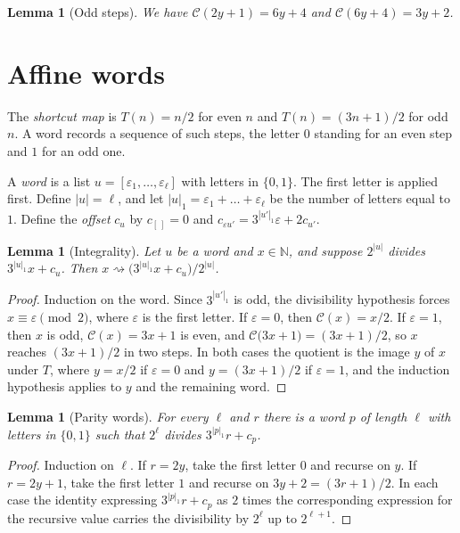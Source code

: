 \documentclass[11pt,reqno,oneside]{amsart}
\theoremstyle{plain}
\newtheorem{lemma}[theorem]{Lemma}
\theoremstyle{definition}
\numberwithin{equation}{section}
\begin{document}
\begin{lemma}[Odd steps]\label{lem:oddsteps}
We have $\mathcal C(2y+1)=6y+4$ and $\mathcal C(6y+4)=3y+2$.
\end{lemma}

\section{Affine words}\label{sec:words}

The \emph{shortcut map} is $T(n)=n/2$ for even $n$ and $T(n)=(3n+1)/2$ for odd $n$. A word records a sequence of such steps, the letter $0$ standing for an even step and $1$ for an odd one.

A \emph{word} is a list $u=[\varepsilon_1,\dots,\varepsilon_\ell]$ with letters in $\{0,1\}$. The first letter is applied first. Define $|u|=\ell$, and let $|u|_1=\varepsilon_1+\dots+\varepsilon_\ell$ be the number of letters equal to $1$. Define the \emph{offset} $c_u$ by $c_{[\,]}=0$ and $c_{\varepsilon u'}=3^{|u'|_1}\varepsilon+2c_{u'}$.

\begin{lemma}[Integrality]\label{lem:integrality}
Let $u$ be a word and $x\in\mathbb N$, and suppose $2^{|u|}$ divides $3^{|u|_1}x+c_u$. Then $x\rightsquigarrow\bigl(3^{|u|_1}x+c_u\bigr)/2^{|u|}$.
\end{lemma}
\begin{proof}
Induction on the word. Since $3^{|u'|_1}$ is odd, the divisibility hypothesis forces $x\equiv\varepsilon\pmod 2$, where $\varepsilon$ is the first letter. If $\varepsilon=0$, then $\mathcal C(x)=x/2$. If $\varepsilon=1$, then $x$ is odd, $\mathcal C(x)=3x+1$ is even, and $\mathcal C\bigl(3x+1\bigr)=(3x+1)/2$, so $x$ reaches $(3x+1)/2$ in two steps. In both cases the quotient is the image $y$ of $x$ under $T$, where $y=x/2$ if $\varepsilon=0$ and $y=(3x+1)/2$ if $\varepsilon=1$, and the induction hypothesis applies to $y$ and the remaining word.
\end{proof}

\begin{lemma}[Parity words]\label{lem:parity}
For every $\ell$ and $r$ there is a word $p$ of length $\ell$ with letters in $\{0,1\}$ such that $2^\ell$ divides $3^{|p|_1}r+c_p$.
\end{lemma}
\begin{proof}
Induction on $\ell$. If $r=2y$, take the first letter $0$ and recurse on $y$. If $r=2y+1$, take the first letter $1$ and recurse on $3y+2=(3r+1)/2$. In each case the identity expressing $3^{|p|_1}r+c_p$ as $2$ times the corresponding expression for the recursive value carries the divisibility by $2^\ell$ up to $2^{\ell+1}$.
\end{proof}
\end{document}

